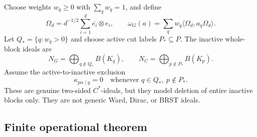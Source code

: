 \documentclass[11pt,a4paper]{article}
\theoremstyle{definition}
\theoremstyle{remark}
\begin{document}
Choose weights $w_q\geq0$ with $\sum_qw_q=1$, and define
\begin{equation}
 \Omega_d=d^{-1/2}\sum_{i=1}^{d}\overline{e_i}\otimes e_i,
 \qquad
 \omega_G(a)=\sum_qw_q\langle\Omega_d,a_q\Omega_d\rangle.
 \label{eq:fos-state}
\end{equation}
Let $Q_*=\{q:w_q>0\}$ and choose active cut labels $P_*\subseteq P$.  The inactive
whole-block ideals are
\begin{equation}
 N_G=\bigoplus_{q\notin Q_*}B(K_q),\qquad
 N_C=\bigoplus_{p\notin P_*}B(K_p).
 \label{eq:block-ideals}
\end{equation}
Assume the active-to-inactive exclusion
\begin{equation}
 \kappa_{p\alpha\mid q}=0
 \quad\text{whenever }q\in Q_*,\ p\notin P_*.
 \label{eq:active-exclusion}
\end{equation}
These are genuine two-sided $C^*$-ideals, but they model deletion of entire inactive
blocks only.  They are not generic Ward, Dirac, or BRST ideals.

\subsection{Finite operational theorem}
\end{document}
